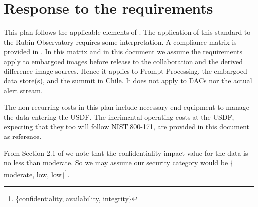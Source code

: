 \section{Response to the requirements}\label{sec:resp}

This plan follows the applicable elements of . The application of this standard to the Rubin Observatory requires some interpretation. A compliance matrix is provided in .
In this matrix and in this document we assume the requirements apply to embargoed images before release to the collaboration and the derived difference image sources.
Hence it applies to Prompt Processing, the embargoed data store(s), and the summit in Chile. It does not apply to DACs nor the actual alert stream.

The non-recurring costs in this plan include necessary end-equipment to manage the data entering the USDF. The incrimental operating costs at the USDF, expecting that they too will follow NIST 800-171, are provided in this document as reference.

From Section 2.1 of  we note that the confidentiality impact value for the data  is no less than moderate.
So we may assume our  security category would be \{ moderate, low, low\}\footnote{\{confidentiality, availability, integrity\}}.








